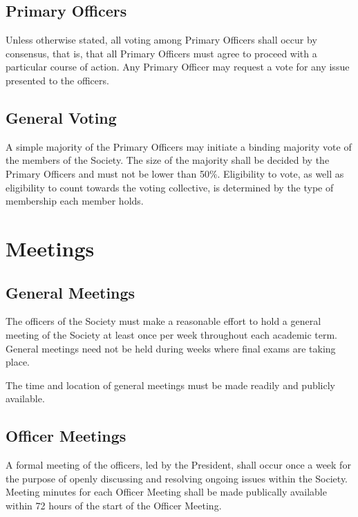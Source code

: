 \documentclass[american]{article}
\begin{document}
\subsection{Primary Officers}
Unless otherwise stated, all voting among Primary Officers shall occur by consensus, that is, that all Primary Officers must agree to proceed with a particular course of action. Any Primary Officer may request a vote for any issue presented to the officers.

\subsection{General Voting}
A simple majority of the Primary Officers may initiate a binding majority vote of the members of the Society. The size of the majority shall be decided by the Primary Officers and must not be lower than 50\%. Eligibility to vote, as well as eligibility to count towards the voting collective, is determined by the type of membership each member holds.

\section{Meetings}

\subsection{General Meetings}
The officers of the Society must make a reasonable effort to hold a general meeting of the Society at least once per week throughout each academic term. General meetings need not be held during weeks where final exams are taking place.

The time and location of general meetings must be made readily and publicly available.

\subsection{Officer Meetings}
A formal meeting of the officers, led by the President, shall occur once a week for the purpose of openly discussing and resolving ongoing issues within the Society. Meeting minutes for each Officer Meeting shall be made publically available within 72 hours of the start of the Officer Meeting.
\end{document}
